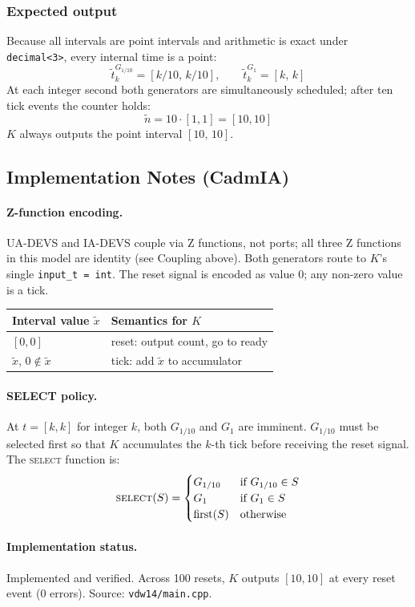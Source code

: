 \subsubsection*{Expected output}

Because all intervals are point intervals and arithmetic is exact under
\texttt{decimal<3>}, every internal time is a point:
\[
  \tilde{t}^{G_{1/10}}_k = [k/10,\, k/10], \qquad
  \tilde{t}^{G_1}_k      = [k,\, k]
\]
At each integer second both generators are simultaneously scheduled;
after ten tick events the counter holds:
\[
  \tilde{n} = 10 \cdot [1,1] = [10,10]
\]
$K$ always outputs the point interval $[10,\,10]$.

\subsection*{Implementation Notes (CadmIA)}

\paragraph{Z-function encoding.}
UA-DEVS and IA-DEVS couple via Z functions, not ports; all three Z functions
in this model are identity (see Coupling above).  Both generators route to
$K$'s single \texttt{input\_t = int}.  The reset signal is encoded as value
$0$; any non-zero value is a tick.

\begin{center}
\begin{tabular}{@{}ll@{}}
  \toprule
  Interval value $\tilde{x}$ & Semantics for $K$ \\
  \midrule
  $[0, 0]$             & reset: output count, go to ready \\
  $\tilde{x}$, $0 \notin \tilde{x}$ & tick: add $\tilde{x}$ to accumulator \\
  \bottomrule
\end{tabular}
\end{center}

\paragraph{SELECT policy.}
At $t = [k,k]$ for integer $k$, both $G_{1/10}$ and $G_1$ are imminent.
$G_{1/10}$ must be selected first so that $K$ accumulates the $k$-th tick
before receiving the reset signal.  The \textsc{select} function is:
\[
  \textsc{select}(S) =
    \begin{cases}
      G_{1/10} & \text{if } G_{1/10} \in S \\
      G_1      & \text{if } G_1 \in S \\
      \text{first}(S) & \text{otherwise}
    \end{cases}
\]

\paragraph{Implementation status.}
Implemented and verified.  Across 100 resets, $K$ outputs $[10,10]$ at
every reset event (0 errors).  Source: \texttt{vdw14/main.cpp}.
